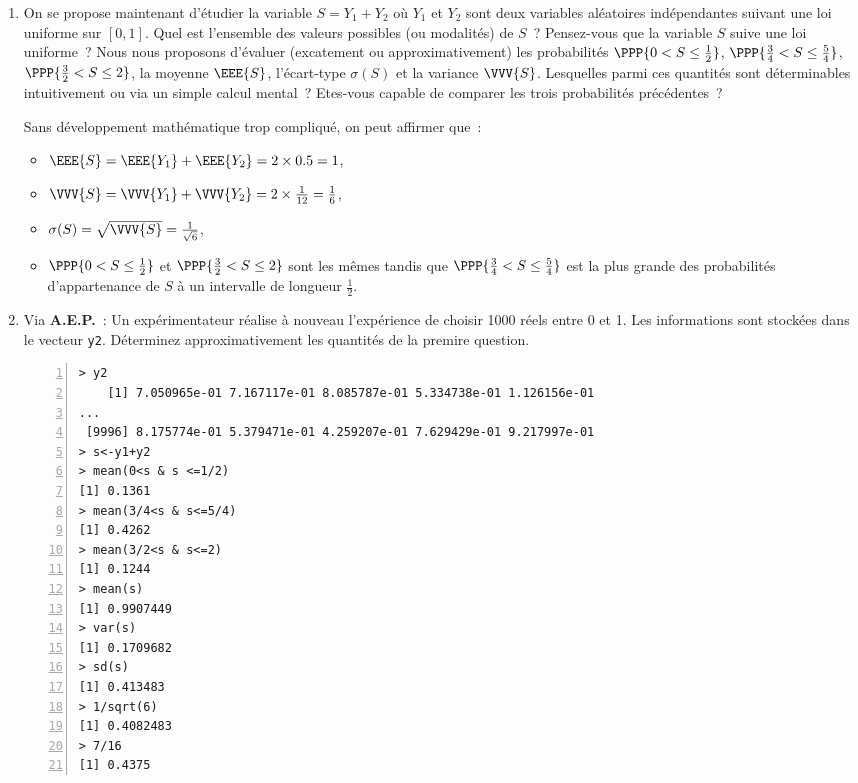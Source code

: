 \documentclass[10pt]{report}
\begin{document}
\begin{exercice}\label{ex:sommeUnifs}
\begin{enumerate}
\item On se propose maintenant d'étudier la variable $S=Y_1+Y_2$ où $Y_1$ et $Y_2$ sont deux variables aléatoires indépendantes suivant une loi uniforme sur $[0,1]$. Quel est l'ensemble des valeurs possibles (ou modalités) de $S$~? Pensez-vous que la variable $S$ suive une loi uniforme~?
Nous nous proposons d'évaluer (excatement ou approximativement) les probabilités $\PPP{0< S \leq \frac12}$, $\PPP{\frac34< S \leq \frac54}$, $\PPP{\frac32< S \leq 2}$, la moyenne $\EEE{S}$, l'écart-type $\sigma(S)$ et la variance $\VVV{S}$.  Lesquelles parmi ces quantités sont déterminables intuitivement ou via un simple calcul mental~? Etes-vous capable de comparer les trois probabilités précédentes~?

\begin{Correction} Sans développement mathématique trop compliqué, on peut affirmer que~:
\begin{itemize}
\item $\EEE{S}=\EEE{Y_1}+\EEE{Y_2}=2\times 0.5=1$, 
\item $\VVV{S}=\VVV{Y_1}+\VVV{Y_2}=2\times \frac1{12}=\frac16$,
\item $\sigma(S)=\sqrt{\VVV{S}}=\frac1{\sqrt{6}}$, 
\item $\PPP{0< S \leq \frac12}$ et $\PPP{\frac32< S \leq 2}$ sont les mêmes tandis que  $\PPP{\frac34< S \leq \frac54}$ est la plus grande des probabilités d'appartenance de $S$ à un intervalle de longueur $\frac12$.
\end{itemize} 
\end{Correction}


\item Via \textbf{A.E.P.}~: Un expérimentateur réalise à nouveau l'expérience de choisir 1000 réels entre 0 et 1. Les informations sont stockées dans le vecteur \texttt{y2}. Déterminez approximativement les quantités de la premire question.
\begin{Verbatim}[frame=leftline,fontfamily=tt,fontshape=n,numbers=left]
> y2
    [1] 7.050965e-01 7.167117e-01 8.085787e-01 5.334738e-01 1.126156e-01
...
 [9996] 8.175774e-01 5.379471e-01 4.259207e-01 7.629429e-01 9.217997e-01
> s<-y1+y2
> mean(0<s & s <=1/2)
[1] 0.1361
> mean(3/4<s & s<=5/4)
[1] 0.4262
> mean(3/2<s & s<=2)
[1] 0.1244
> mean(s)
[1] 0.9907449
> var(s)
[1] 0.1709682
> sd(s)
[1] 0.413483
> 1/sqrt(6)
[1] 0.4082483
> 7/16
[1] 0.4375
\end{Verbatim}



\end{enumerate}
\end{exercice}
\end{document}

